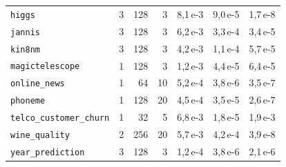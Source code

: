 \begin{table}[htbp]
\begin{tabular}{lrrrrrr}
\texttt{higgs} & 3 & 128 & 3 & 8{,}1\,e-3 & 9{,}0\,e-5 & 1{,}7\,e-8 \\
\texttt{jannis} & 3 & 128 & 3 & 6{,}2\,e-3 & 3{,}3\,e-4 & 3{,}4\,e-5 \\
\texttt{kin8nm} & 3 & 128 & 3 & 4{,}2\,e-3 & 1{,}1\,e-4 & 5{,}7\,e-5 \\
\texttt{magictelescope} & 1 & 128 & 3 & 1{,}2\,e-3 & 4{,}4\,e-5 & 6{,}4\,e-5 \\
\texttt{online\_news} & 1 & 64 & 10 & 5{,}2\,e-4 & 3{,}8\,e-6 & 3{,}5\,e-7 \\
\texttt{phoneme} & 1 & 128 & 20 & 4{,}5\,e-4 & 3{,}5\,e-5 & 2{,}6\,e-7 \\
\texttt{telco\_\allowbreak customer\_\allowbreak churn} & 1 & 32 & 5 & 6{,}8\,e-3 & 1{,}8\,e-5 & 1{,}9\,e-3 \\
\texttt{wine\_quality} & 2 & 256 & 20 & 5{,}7\,e-3 & 4{,}2\,e-4 & 3{,}9\,e-8 \\
\texttt{year\_\allowbreak prediction} & 3 & 128 & 3 & 1{,}2\,e-4 & 3{,}8\,e-6 & 2{,}1\,e-6 \\
\bottomrule
\end{tabular}
\end{table}

